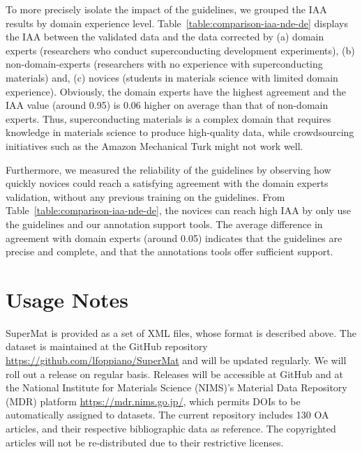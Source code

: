 \documentclass[fleqn,10pt]{wlscirep}
\begin{document}
To more precisely isolate the impact of the guidelines, we grouped the IAA results by domain experience level. 
Table~\ref{table:comparison-iaa-nde-de} displays the IAA between the validated data and the data corrected by (a) domain experts (researchers who conduct superconducting development experiments), (b) non-domain-experts (researchers with no experience with superconducting materials) and, (c) novices (students in materials science with limited domain experience). 
Obviously, the domain experts have the highest agreement and the IAA value (around 0.95) is 0.06 higher on average than that of non-domain experts. 
Thus, superconducting materials is a complex domain that requires knowledge in materials science to produce high-quality data, while crowdsourcing initiatives such as the Amazon Mechanical Turk might not work well. 

Furthermore, we measured the reliability of the guidelines by observing how quickly novices could reach a satisfying agreement with the domain experts validation, without any previous training on the guidelines.
From Table~\ref{table:comparison-iaa-nde-de}, the  novices can reach high IAA by only use the guidelines and our annotation support tools. 
The average difference in agreement with domain experts (around 0.05) indicates that the guidelines are precise and complete, and that the annotations tools offer sufficient support. 

\section*{Usage Notes}
\label{sec:usage-notes}
SuperMat is provided as a set of XML files, whose format is described above. 
The dataset is maintained at the GitHub repository  \url{https://github.com/lfoppiano/SuperMat} and will be updated regularly. 
We will roll out a release on regular basis. 
Releases will be accessible at GitHub and at the National Institute for Materials Science (NIMS)'s Material Data Repository (MDR) platform \url{https://mdr.nims.go.jp/}, which permits DOIs to be automatically assigned to datasets.
The current repository includes 130 OA articles, and their respective bibliographic data as reference. 
The copyrighted articles will not be re-distributed due to their restrictive licenses.
\end{document}
